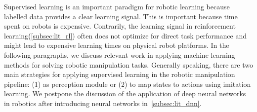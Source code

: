 \documentclass[\home/main.tex]{subfiles}
\begin{document}
Supervised learning is an important paradigm for robotic learning because labelled data provides a clear learning signal. This is important because time spent on robots is expensive. Contrarily, the learning signal in reinforcement learning(\cref{subsec:lit_rl}) often does not optimize for direct task performance and might lead to expensive learning times on physical robot platforms. In the following paragraphs, we discuss relevant work in applying machine learning methods for solving robotic manipulation tasks. Generally speaking, there are two main strategies for applying supervised learning in the robotic manipulation pipeline: (1) as perception module or (2) to map states to actions using imitation learning. We postpone the discussion of the application of deep neural networks in robotics after introducing neural networks in~\cref{subsec:lit_dnn}.
\end{document}
